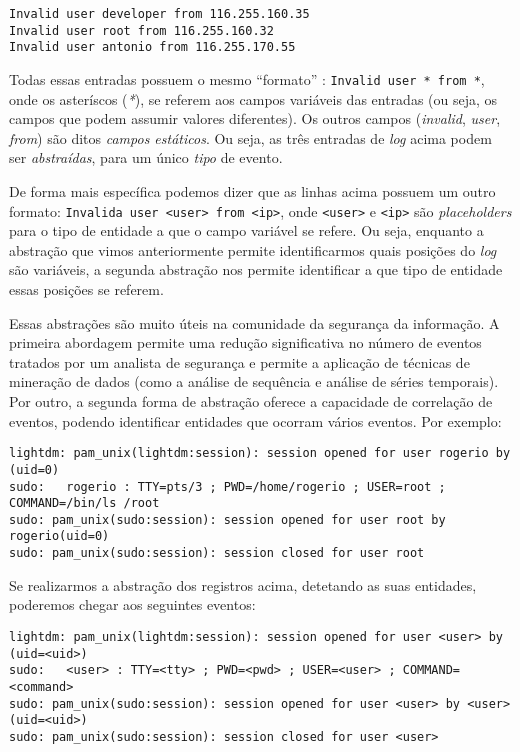 \documentclass[
	12pt,				%
	openright,			%
	twoside,			%
	a4paper,			%
	english,			%
	spanish,			%
	brazil,				%
	]{abntex2}
\begin{document}
\begin{verbatim}
Invalid user developer from 116.255.160.35
Invalid user root from 116.255.160.32
Invalid user antonio from 116.255.170.55
\end{verbatim}

Todas essas entradas possuem o mesmo ``formato'' : \verb|Invalid user * from *|, onde os asteríscos (\emph{*}), se referem aos campos variáveis das entradas (ou seja, os campos que podem assumir valores diferentes). Os outros campos (\emph{invalid}, \emph{user}, \emph{from}) são ditos \emph{campos estáticos}. Ou seja, as três entradas de \emph{log} acima podem ser \emph{abstraídas}, para um único \emph{tipo} de evento.

De forma mais específica podemos dizer que as linhas acima possuem um outro formato: \verb|Invalida user <user> from <ip>|, onde \verb|<user>| e \verb|<ip>| são \emph{placeholders} para o tipo de entidade a que o campo variável se refere. Ou seja, enquanto a abstração que vimos anteriormente permite identificarmos quais posições do \emph{log} são variáveis, a segunda abstração nos permite identificar a que tipo de entidade essas posições se referem.

Essas abstrações são muito úteis na comunidade da segurança da informação. A primeira abordagem permite uma redução significativa no número de eventos tratados por um analista de segurança e permite a aplicação de técnicas de mineração de dados (como a análise de sequência e análise de séries temporais). Por outro, a segunda forma de abstração oferece a capacidade de correlação de eventos, podendo identificar entidades que ocorram vários eventos. Por exemplo:

{\small
\begin{verbatim}
lightdm: pam_unix(lightdm:session): session opened for user rogerio by (uid=0)
sudo:   rogerio : TTY=pts/3 ; PWD=/home/rogerio ; USER=root ; COMMAND=/bin/ls /root
sudo: pam_unix(sudo:session): session opened for user root by rogerio(uid=0)
sudo: pam_unix(sudo:session): session closed for user root
\end{verbatim}
}

Se realizarmos a abstração dos registros acima, detetando as suas entidades, poderemos chegar aos seguintes eventos:

{\small
\begin{verbatim}
lightdm: pam_unix(lightdm:session): session opened for user <user> by (uid=<uid>)
sudo:   <user> : TTY=<tty> ; PWD=<pwd> ; USER=<user> ; COMMAND=<command>
sudo: pam_unix(sudo:session): session opened for user <user> by <user>(uid=<uid>)
sudo: pam_unix(sudo:session): session closed for user <user>
\end{verbatim}
}
\end{document}
